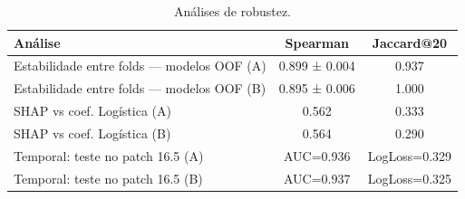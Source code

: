 \begin{table}[htbp]
\caption{Análises de robustez.}
\label{tab:robustez}
\centering
\small
\begin{tabular}{lcc}
\toprule
Análise & Spearman & Jaccard@20 \\
\midrule
Estabilidade entre folds — modelos OOF (A) & 0.899 ± 0.004 & 0.937 \\
Estabilidade entre folds — modelos OOF (B) & 0.895 ± 0.006 & 1.000 \\
SHAP vs coef. Logística (A) & 0.562 & 0.333 \\
SHAP vs coef. Logística (B) & 0.564 & 0.290 \\
Temporal: teste no patch 16.5 (A) & AUC=0.936 & LogLoss=0.329 \\
Temporal: teste no patch 16.5 (B) & AUC=0.937 & LogLoss=0.325 \\
\bottomrule
\end{tabular}
\end{table}
